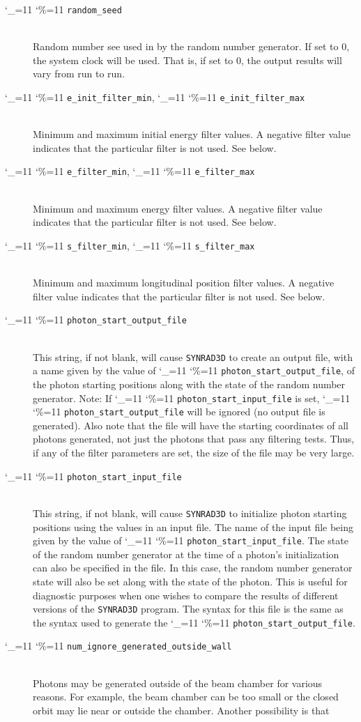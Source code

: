 \documentclass[11pt]{article}
\newcommand{\srthree}{\texttt{SYNRAD3D}\xspace}
\newcommand\ttcmd{\begingroup\catcode`\_=11 \catcode`\%=11 \dottcmd}
\newcommand\dottcmd[1]{\texttt{#1}\endgroup}
\newcommand{\vn}{\ttcmd}
\newcommand{\Newline}{\hfil \\}
\begin{document}
\begin{description}
  \item[\vn{random_seed}] \Newline
Random number see used in by the random number generator. If set to 0, the system clock
will be used. That is, if set to 0, the output results will vary from run to run. 
  \item[\vn{e_init_filter_min}, \vn{e_init_filter_max}] \Newline
Minimum and maximum initial energy filter values. A negative filter value
indicates that the particular filter is not used. See below.
  \item[\vn{e_filter_min}, \vn{e_filter_max}] \Newline
Minimum and maximum energy filter values. A negative filter value
indicates that the particular filter is not used. See below.
  \item[\vn{s_filter_min}, \vn{s_filter_max}] \Newline
Minimum and maximum longitudinal position filter values. A negative filter value
indicates that the particular filter is not used. See below.
  \item[\vn{photon_start_output_file}] \Newline
This string, if not blank, will cause \srthree to create an output
file, with a name given by the value of \vn{photon_start_output_file},
of the photon starting positions along with the state of the random
number generator. Note: If
\vn{photon_start_input_file} is set, \vn{photon_start_output_file} will
be ignored (no output file is generated). Also note that the file will
have the starting coordinates of all photons generated, not just the
photons that pass any filtering tests. Thus, if any of the filter
parameters are set, the size of the file may be very large.
  \item[\vn{photon_start_input_file}] \Newline
This string, if not blank, will cause \srthree to initialize photon
starting positions using the values in an input file. The name of the
input file being given by the value of \vn{photon_start_input_file}.
The state of the random number generator at the time of a photon's
initialization can also be specified in the file. In this case, the
random number generator state will also be set along with the state of
the photon. This is useful for diagnostic purposes when one wishes to
compare the results of different versions of the \srthree program. The
syntax for this file is the same as the syntax used to generate the
\vn{photon_start_output_file}. 
  \item[\vn{num_ignore_generated_outside_wall}] \Newline
Photons may be generated outside of the beam chamber for various
reasons. For example, the beam chamber can be too small or the closed
orbit may lie near or outside the chamber. Another possibility is that

\end{description}
\end{document}
